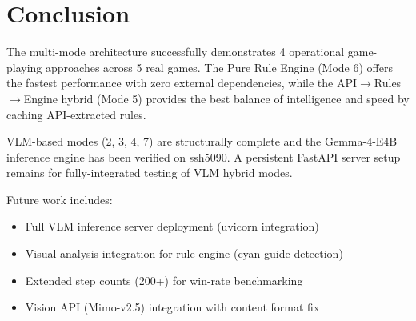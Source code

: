 \documentclass[11pt,a4paper]{article}
\begin{document}
\section{Conclusion}

The multi-mode architecture successfully demonstrates 4 operational game-playing approaches 
across 5 real games. The Pure Rule Engine (Mode 6) offers the fastest performance with 
zero external dependencies, while the API$\to$Rules$\to$Engine hybrid (Mode 5) provides 
the best balance of intelligence and speed by caching API-extracted rules.

VLM-based modes (2, 3, 4, 7) are structurally complete and the Gemma-4-E4B inference 
engine has been verified on ssh5090. A persistent FastAPI server setup remains for 
fully-integrated testing of VLM hybrid modes.

Future work includes:
\begin{itemize}
  \item Full VLM inference server deployment (uvicorn integration)
  \item Visual analysis integration for rule engine (cyan guide detection)
  \item Extended step counts (200+) for win-rate benchmarking
  \item Vision API (Mimo-v2.5) integration with content format fix
\end{itemize}
\end{document}
